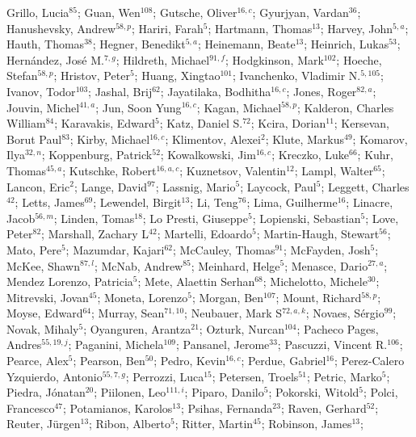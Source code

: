 Grillo, Lucia$^{85}$;
Guan, Wen$^{108}$;
Gutsche, Oliver$^{16,c}$;
Gyurjyan, Vardan$^{36}$;
Hanushevsky, Andrew$^{58,p}$;
Hariri, Farah$^{5}$;
Hartmann, Thomas$^{13}$;
Harvey, John$^{5,a}$;
Hauth, Thomas$^{38}$;
Hegner, Benedikt$^{5,a}$;
Heinemann, Beate$^{13}$;
Heinrich, Lukas$^{53}$;
Hernández, José M.$^{7,g}$;
Hildreth, Michael$^{91,f}$;
Hodgkinson, Mark$^{102}$;
Hoeche, Stefan$^{58,p}$;
Hristov, Peter$^{5}$;
Huang, Xingtao$^{101}$;
Ivanchenko, Vladimir N.$^{5,105}$;
Ivanov, Todor$^{103}$;
Jashal, Brij$^{62}$;
Jayatilaka, Bodhitha$^{16,c}$;
Jones, Roger$^{82,a}$;
Jouvin, Michel$^{41,a}$;
Jun, Soon Yung$^{16,c}$;
Kagan, Michael$^{58,p}$;
Kalderon, Charles William$^{84}$;
Karavakis, Edward$^{5}$;
Katz, Daniel S.$^{72}$;
Kcira, Dorian$^{11}$;
Kersevan, Borut Paul$^{83}$;
Kirby, Michael$^{16,c}$;
Klimentov, Alexei$^{2}$;
Klute, Markus$^{49}$;
Komarov, Ilya$^{32,n}$;
Koppenburg, Patrick$^{52}$;
Kowalkowski, Jim$^{16,c}$;
Kreczko, Luke$^{66}$;
Kuhr, Thomas$^{45,a}$;
Kutschke, Robert$^{16,a,c}$;
Kuznetsov, Valentin$^{12}$;
Lampl, Walter$^{65}$;
Lancon, Eric$^{2}$;
Lange, David$^{97}$;
Lassnig, Mario$^{5}$;
Laycock, Paul$^{5}$;
Leggett, Charles$^{42}$;
Letts, James$^{69}$;
Lewendel, Birgit$^{13}$;
Li, Teng$^{76}$;
Lima, Guilherme$^{16}$;
Linacre, Jacob$^{56,m}$;
Linden, Tomas$^{18}$;
Lo Presti, Giuseppe$^{5}$;
Lopienski, Sebastian$^{5}$;
Love, Peter$^{82}$;
Marshall, Zachary L$^{42}$;
Martelli, Edoardo$^{5}$;
Martin-Haugh, Stewart$^{56}$;
Mato, Pere$^{5}$;
Mazumdar, Kajari$^{62}$;
McCauley, Thomas$^{91}$;
McFayden, Josh$^{5}$;
McKee, Shawn$^{87,l}$;
McNab, Andrew$^{85}$;
Meinhard, Helge$^{5}$;
Menasce, Dario$^{27,a}$;
Mendez Lorenzo, Patricia$^{5}$;
Mete, Alaettin Serhan$^{68}$;
Michelotto, Michele$^{30}$;
Mitrevski, Jovan$^{45}$;
Moneta, Lorenzo$^{5}$;
Morgan, Ben$^{107}$;
Mount, Richard$^{58,p}$;
Moyse, Edward$^{64}$;
Murray, Sean$^{71,10}$;
Neubauer, Mark S$^{72,a,k}$;
Novaes, Sérgio$^{99}$;
Novak, Mihaly$^{5}$;
Oyanguren, Arantza$^{21}$;
Ozturk, Nurcan$^{104}$;
Pacheco Pages, Andres$^{55,19,j}$;
Paganini, Michela$^{109}$;
Pansanel, Jerome$^{33}$;
Pascuzzi, Vincent R.$^{106}$;
Pearce, Alex$^{5}$;
Pearson, Ben$^{50}$;
Pedro, Kevin$^{16,c}$;
Perdue, Gabriel$^{16}$;
Perez-Calero Yzquierdo, Antonio$^{55,7,g}$;
Perrozzi, Luca$^{15}$;
Petersen, Troels$^{51}$;
Petric, Marko$^{5}$;
Piedra, Jónatan$^{20}$;
Piilonen, Leo$^{111,i}$;
Piparo, Danilo$^{5}$;
Pokorski, Witold$^{5}$;
Polci, Francesco$^{47}$;
Potamianos, Karolos$^{13}$;
Psihas, Fernanda$^{23}$;
Raven, Gerhard$^{52}$;
Reuter, Jürgen$^{13}$;
Ribon, Alberto$^{5}$;
Ritter, Martin$^{45}$;
Robinson, James$^{13}$;
